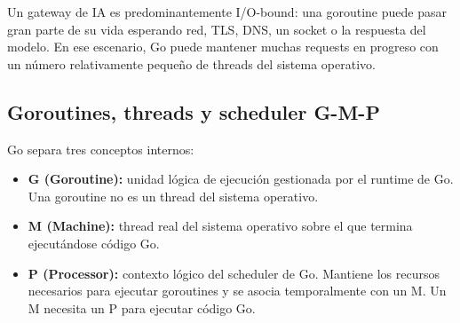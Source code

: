 \documentclass[11pt,a4paper]{article}
\begin{document}
Un gateway de IA es predominantemente I/O-bound: una goroutine puede pasar gran parte de su vida esperando red, TLS, DNS, un socket o la respuesta del modelo. En ese escenario, Go puede mantener muchas requests en progreso con un número relativamente pequeño de threads del sistema operativo.

\subsection{Goroutines, threads y scheduler G-M-P}

Go separa tres conceptos internos:

\begin{itemize}
  \item \textbf{G (Goroutine):} unidad lógica de ejecución gestionada por el runtime de Go. Una goroutine no es un thread del sistema operativo.
  \item \textbf{M (Machine):} thread real del sistema operativo sobre el que termina ejecutándose código Go.
  \item \textbf{P (Processor):} contexto lógico del scheduler de Go. Mantiene los recursos necesarios para ejecutar goroutines y se asocia temporalmente con un M. Un M necesita un P para ejecutar código Go.
\end{itemize}
\end{document}
